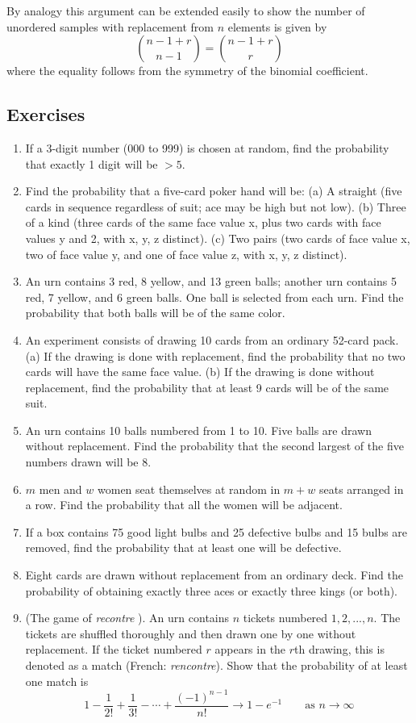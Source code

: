 \documentclass[../main.tex]{subfiles}
\begin{document}
By analogy this argument can be extended easily to show the number of unordered samples with replacement from $n$ elements is given by $${n-1+r \choose n-1} = {n-1+r \choose r}$$
where the equality follows from the symmetry of the binomial coefficient.

{\fontsize{10}{10}\selectfont

\subsection{Exercises} %
\begin{enumerate}
	\item If a 3-digit number (000 to 999) is chosen at random, find the probability that
	exactly 1 digit will be $>5$.
	\item  Find the probability that a five-card poker hand will be:
	(a) A straight (five cards in sequence regardless of suit; ace may be high but
	not low).
	(b) Three of a kind (three cards of the same face value x, plus two cards with
	face values y and 2, with x, y, z distinct).
	(c) Two pairs (two cards of face value x, two of face value y, and one of face
	value z, with x, y, z distinct).
	\item  An urn contains 3 red, 8 yellow, and 13 green balls; another urn contains 5
	red, 7 yellow, and 6 green balls. One ball is selected from each urn. Find the
	probability that both balls will be of the same color.
	\item  An experiment consists of drawing 10 cards from an ordinary 52-card pack.
	(a) If the drawing is done with replacement, find the probability that no two
	cards will have the same face value.
	(b) If the drawing is done without replacement, find the probability that at
	least 9 cards will be of the same suit.
	\item  An urn contains 10 balls numbered from 1 to 10. Five balls are drawn without
	replacement. Find the probability that the second largest of the five numbers
	drawn will be 8.
	\item  $m$ men and $w$ women seat themselves at random in $m + w$ seats arranged in a
	row. Find the probability that all the women will be adjacent.
	\item  If a box contains 75 good light bulbs and 25 defective bulbs and 15 bulbs are
	removed, find the probability that at least one will be defective.
	\item  Eight cards are drawn without replacement from an ordinary deck. Find the
	probability of obtaining exactly three aces or exactly three kings (or both).
	\item (The game of \textit{recontre} ). An urn contains $n$ tickets numbered $1,2,...,n$.
	The tickets are shuffled thoroughly and then drawn one by one without replacement.
	If the ticket numbered $r$ appears in the $r$th drawing, this is denoted
	as a match (French: \textit{rencontre}). Show that the probability of at least one match
	is
	$$ 1 - \frac{1}{2!} + \frac{1}{3!} - \cdots + \frac{(-1)^{n-1}}{n!}
	\rightarrow 1 - e^{-1} \qquad \mbox{as } n \rightarrow \infty$$
	

\end{enumerate}}
\end{document}

